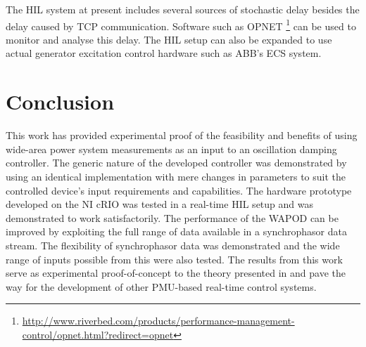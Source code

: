 \documentclass[journal]{IEEEtran}
\begin{document}
The HIL system at present includes several sources of stochastic delay besides the delay caused by TCP communication. Software such as OPNET \footnote{\url{http://www.riverbed.com/products/performance-management-control/opnet.html?redirect=opnet}} can be used to monitor and analyse this delay. The HIL setup can also be expanded to use actual generator excitation control hardware such as ABB's ECS system.

\section{Conclusion}\label{Conclusion}
This work has provided experimental proof of the feasibility and benefits of using wide-area power system measurements as an input to an oscillation damping controller. The generic nature of the developed controller was demonstrated by using an identical implementation with mere changes in parameters to suit the controlled device's input requirements and capabilities. The hardware prototype developed on the NI cRIO was tested in a real-time HIL setup and was demonstrated to work satisfactorily. The performance of the WAPOD can be improved by exploiting the full range of data available in a synchrophasor data stream. The flexibility of synchrophasor data was demonstrated and the wide range of inputs possible from this were also tested. The results from this work serve as experimental proof-of-concept to the theory presented in \cite{Yuwa} and pave the way for the development of other PMU-based real-time control systems.


%
\end{document}
